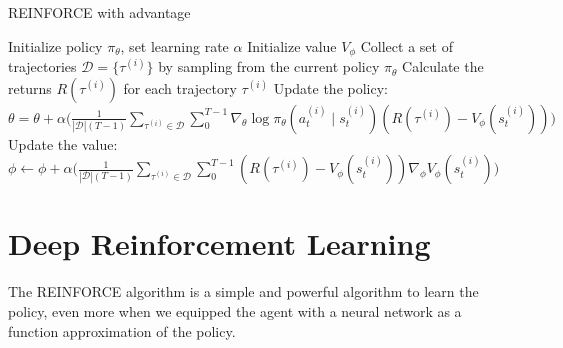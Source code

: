 \begin{algorithm}
    \caption{REINFORCE with advantage}
    \begin{algorithmic}
    \STATE Initialize policy $\pi_{\theta}$, set learning rate $\alpha$
    \STATE Initialize value $V_{\phi}$
        \STATE Collect a set of trajectories $\mathcal{D}=\{\tau^{(i)}\}$ by sampling from the current policy $\pi_{\theta}$
        \STATE Calculate the returns $R(\tau^{(i)})$ for each trajectory $\tau^{(i)}$
        \STATE Update the policy: $\theta = \theta + \alpha \bigg(\frac{1}{|\mathcal{D}|(T-1)}\sum_{\tau^{(i)}\in\mathcal{D}}\sum_{0}^{T-1}\nabla_{\theta}\log\pi_{\theta}(a_{t}^{(i)}\mid s_{t}^{(i)})(R(\tau^{(i)}) - V_{\phi}(s_{t}^{(i)}))\bigg)$
        \STATE Update the value: $\phi \leftarrow \phi + \alpha \bigg(\frac{1}{|\mathcal{D}|(T-1)}\sum_{\tau^{(i)}\in\mathcal{D}}\sum_{0}^{T-1}(R(\tau^{(i)}) - V_{\phi}(s_{t}^{(i)}))\nabla_{\phi}V_{\phi}(s_{t}^{(i)})\bigg)$
    \ENDFOR
    \end{algorithmic}
\end{algorithm}




\section{Deep Reinforcement Learning}


The REINFORCE algorithm is a simple and powerful algorithm to learn the policy,
even more when we equipped the agent with a neural network as a function 
approximation of the policy. 

